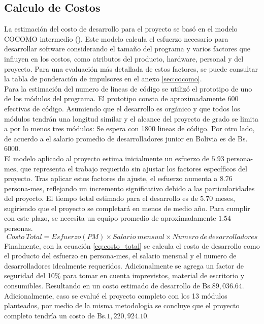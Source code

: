 \subsection{Calculo de Costos}
La estimación del costo de desarrollo para el proyecto se basó en el modelo COCOMO intermedio (\cite{basavaraj2008empirical}). Este modelo calcula el esfuerzo necesario para desarrollar software considerando el tamaño del programa y varios factores que influyen en los costos, como atributos del producto, hardware, personal y del proyecto. Para una evaluación más detallada de estos factores, se puede consultar la tabla de ponderación de impulsores en el anexo \ref{sec:cocomo}. \\
Para la estimación del numero de lineas de código se utilizó el prototipo de uno de los módulos del programa. El prototipo consta de aproximadamente 600  efectivas de código. Asumiendo que el desarrollo es orgánico y que todos los módulos tendrán una longitud similar y el alcance del proyecto de grado se limita a por lo menos tres módulos: Se espera con 1800 lineas de código. Por otro lado, de acuerdo a \textcite{glassdoor2024} el salario promedio de desarrolladores junior en Bolivia es de Bs. 6000.\\ 
El modelo aplicado al proyecto estima inicialmente un esfuerzo de $5.93$ persona-mes, que representa el trabajo requerido sin ajustar los factores específicos del proyecto. Tras aplicar estos factores de ajuste, el esfuerzo aumenta a $8.76$ persona-mes, reflejando un incremento significativo debido a las particularidades del proyecto. El tiempo total estimado para el desarrollo es de $5.70$ meses, sugiriendo que el proyecto se completará en menos de medio año. Para cumplir con este plazo, se necesita un equipo promedio de aproximadamente $1.54$ personas. \\
\begin{equation}\label{eq:costo_total}
    Costo\ Total = Esfuerzo(PM) \times Salario\ mensual \times Numero\ de\ desarrolladores
\end{equation}
Finalmente, con la ecuación \ref{eq:costo_total} se calcula el costo de desarrollo como el producto del esfuerzo en persona-mes, el salario mensual y el numero de desarrolladores idealmente requeridos. Adicionalmente se agrega un factor de seguridad del 10\% para tomar en cuenta imprevistos, material de escritorio y consumibles. Resultando en un costo estimado de desarrollo de Bs.$89,036.64$. Adicionalmente, caso se evalué el proyecto completo con los 13 módulos planteados, por medio de la misma metodología se concluye que el proyecto completo tendría un costo de Bs.$1,220,924.10$.


